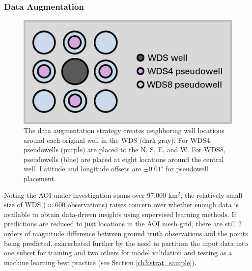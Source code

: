 \subsubsection{Data Augmentation}\label{ch3:augmentation}
\begin{figure}
\centering
\includegraphics[scale=0.9]{templates/images/Figure-AugmentedWells.png}
\singlespacing
\caption[Data augmentation strategy]{The data augmentation strategy creates neighboring well locations around each original well in the WDS (dark gray). For WDS4, pseudowells (purple) are placed to the N, S, E, and W. For WDS8, pseudowells (blue) are placed at eight locations around the central well. Latitude and longitude offsets are $\pm0.01^\circ$ for pseudowell placement.}
\label{fig:data_augmentation}
\end{figure}

Noting the AOI under investigation spans over 97,000 km$^2$, the relatively small size of WDS ($\approx$600 observations) raises concern over whether enough data is available to obtain data-driven insights using supervised learning methods. If predictions are reduced to just locations in the AOI mesh grid, there are still 2 orders of magnitude difference between ground truth observations and the points being predicted, exacerbated further by the need to partition the input data into one subset for training and two others for model validation and testing as a machine learning best practice \citep[e.g.,][p.\ 222]{hastie_elements_2009} (see Section \ref{ch3:strat_sample}). 

